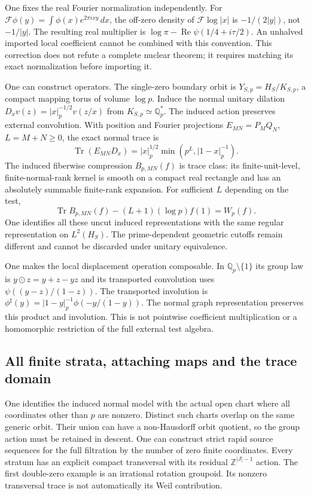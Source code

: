 \documentclass[11pt]{amsart}
\theoremstyle{definition}
\theoremstyle{remark}
\newcommand{\Z}{\mathbb Z}
\newcommand{\Q}{\mathbb Q}
\newcommand{\Tr}{\operatorname{Tr}}
\begin{document}
One fixes the real Fourier normalization independently. For
$\mathcal F\phi(y)=\int\phi(x)e^{2\pi ixy}\,dx$, the off-zero density
of $\mathcal F\log|x|$ is $-1/(2|y|)$, not $-1/|y|$.
The resulting real multiplier is
$\log\pi-\operatorname{Re}\psi(1/4+i\tau/2)$.
An unhalved imported local coefficient cannot be combined with this
convention. This correction does not refute a complete nuclear theorem;
it requires matching its exact normalization before importing it.

One can construct operators. The single-zero boundary orbit is
$Y_{S,p}=H_S/K_{S,p}$, a compact mapping torus of volume $\log p$.
Induce the normal unitary dilation
$D_xv(z)=|x|_p^{-1/2}v(z/x)$ from $K_{S,p}\simeq\Q_p^*$.
The induced action preserves external convolution. With position and
Fourier projections $E_{MN}=P_MQ_N$, $L=M+N\ge0$, the exact normal trace is
\[
 \Tr(E_{MN}D_x)=|x|_p^{1/2}\min(p^L,|1-x|_p^{-1}).
\]
The induced fiberwise compression $B_{p,MN}(f)$ is trace class: its
finite-unit-level, finite-normal-rank kernel is smooth on a compact real
rectangle and has an absolutely summable finite-rank expansion. For
sufficient $L$ depending on the test,
\[
 \Tr B_{p,MN}(f)-(L+1)(\log p)f(1)=W_p(f).
\]
One identifies all these uncut induced representations with the same
regular representation on $L^2(H_S)$. The prime-dependent geometric
cutoffs remain different and cannot be discarded under unitary equivalence.

One makes the local displacement operation composable. In
$\Q_p\setminus\{1\}$ its group law is $y\odot z=y+z-yz$ and its
transported convolution uses $\psi((y-z)/(1-z))$. The transported
involution is
$\phi^\sharp(y)=|1-y|_p^{-1}\overline{\phi(-y/(1-y))}$.
The normal graph representation preserves this product and involution.
This is not pointwise coefficient multiplication or a homomorphic
restriction of the full external test algebra.

\subsection{All finite strata, attaching maps and the trace domain}
One identifies the induced normal model with the actual open chart
where all coordinates other than $p$ are nonzero. Distinct such charts
overlap on the same generic orbit. Their union can have a non-Hausdorff
orbit quotient, so the group action must be retained in descent.
One can construct strict rapid source sequences for the full filtration
by the number of zero finite coordinates. Every stratum has an explicit
compact transversal with its residual $\Z^{|J|-1}$ action. The first
double-zero example is an irrational rotation groupoid.
Its nonzero transversal trace is not automatically its Weil contribution.
\end{document}
